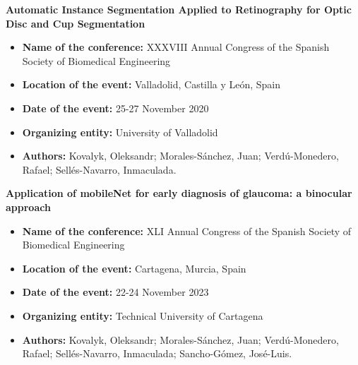 \documentclass[10pt]{article}
\begin{document}
\noindent{\LARGE \textcolor{black}{National Conferences}}
\vspace{-1.5pt}
\par\noindent\hrulefill %

\noindent\textbf{\large{Automatic Instance Segmentation Applied to Retinography for Optic Disc and Cup Segmentation}} 
\begin{itemize}[itemsep = -0.75 mm, leftmargin=*]
	\item[{\color[RGB]{10,0,254}$\bullet$}] \noindent \textbf{Name of the conference:} XXXVIII Annual Congress of the Spanish Society of Biomedical Engineering
	\item[{\color[RGB]{10,0,254}$\bullet$}] \noindent \textbf{Location of the event:} Valladolid, Castilla y Le\'on, Spain	
	\item[{\color[RGB]{10,0,254}$\bullet$}] \noindent \textbf{Date of the event:} 25-27 November 2020
	\item[{\color[RGB]{10,0,254}$\bullet$}] \noindent \textbf{Organizing entity:} University of Valladolid 
	\item[{\color[RGB]{10,0,254}$\bullet$}] \noindent \textbf{Authors:} Kovalyk, Oleksandr; Morales-S\'anchez, Juan; Verd\'u-Monedero, Rafael; Sell\'es-Navarro, Inmaculada. 
\end{itemize}

\noindent\textbf{\large{Application of mobileNet for early diagnosis of glaucoma: a binocular approach}} 
\begin{itemize}[itemsep = -0.75 mm, leftmargin=*]
	\item[{\color[RGB]{10,0,254}$\bullet$}] \noindent \textbf{Name of the conference:} XLI Annual Congress of the Spanish Society of Biomedical Engineering
	\item[{\color[RGB]{10,0,254}$\bullet$}] \noindent \textbf{Location of the event:} Cartagena, Murcia, Spain	
	\item[{\color[RGB]{10,0,254}$\bullet$}] \noindent \textbf{Date of the event:} 22-24 November 2023
	\item[{\color[RGB]{10,0,254}$\bullet$}] \noindent \textbf{Organizing entity:} Technical University of Cartagena 
	\item[{\color[RGB]{10,0,254}$\bullet$}] \noindent \textbf{Authors:} Kovalyk, Oleksandr; Morales-S\'anchez, Juan; Verd\'u-Monedero, Rafael; Sell\'es-Navarro, Inmaculada;
	Sancho-G\'omez, Jos\'e-Luis. 
\end{itemize}

\end{document}
